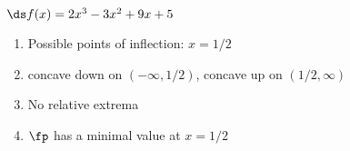 {$\ds f(x) = 2x^3-3x^2+9x+5$
}
{\begin{enumerate}[label=(\alph*)]
\item Possible points of inflection: $x=1/2$
\item concave down on $(-\infty,1/2)$, concave up on $(1/2,\infty)$
\item No relative extrema
\item $\fp$ has a minimal value at $x=1/2$
\end{enumerate}}
